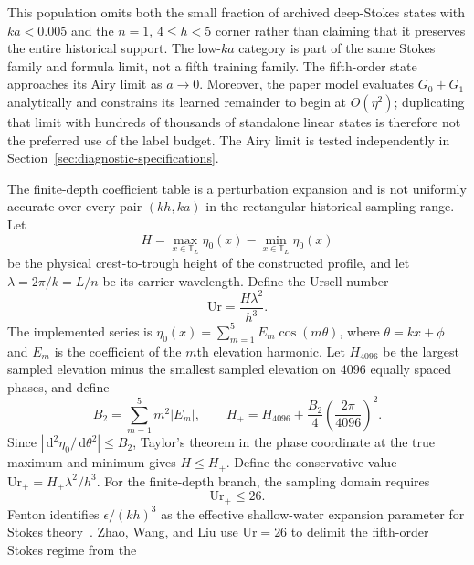 \documentclass[11pt]{article}
\newcommand{\T}{\mathbb T}
\newcommand{\dd}{\,\mathrm d}
\begin{document}
This population omits both the small fraction of archived deep-Stokes states
with $ka<0.005$ and the $n=1$, $4\leq h<5$ corner rather than claiming that
it preserves the entire historical support.  The low-$ka$ category is part of the
same Stokes family and formula limit, not a fifth training family.  The
fifth-order state
approaches its Airy limit as $a\to0$.  Moreover, the paper model evaluates
$G_0+G_1$ analytically and constrains its learned remainder to begin at
$O(\eta^2)$; duplicating that limit with hundreds of thousands of standalone
linear states is therefore not the preferred use of the label budget.  The
Airy limit is tested independently in
Section~\ref{sec:diagnostic-specifications}.

The finite-depth coefficient table is a perturbation expansion and is not
uniformly accurate over every pair $(kh,ka)$ in the rectangular historical
sampling range.  Let
\begin{equation}
  H=\max_{x\in\T_L}\eta_0(x)-\min_{x\in\T_L}\eta_0(x)
\end{equation}
be the physical crest-to-trough height of the constructed profile, and let
$\lambda=2\pi/k=L/n$ be its carrier wavelength.  Define the Ursell number
\begin{equation}
  \mathrm{Ur}=\frac{H\lambda^2}{h^3}.
  \label{eq:stokes-ursell-number}
\end{equation}
The implemented series is
$\eta_0(x)=\sum_{m=1}^{5}E_m\cos(m\theta)$, where
$\theta=kx+\phi$ and $E_m$ is the coefficient of the $m$th elevation
harmonic.  Let $H_{4096}$ be the
largest sampled elevation minus the smallest sampled elevation on 4096
equally spaced phases, and define
\begin{equation}
  B_2=\sum_{m=1}^{5}m^2|E_m|,
  \qquad
  H_+=H_{4096}
      +\frac{B_2}{4}\left(\frac{2\pi}{4096}\right)^2.
  \label{eq:stokes-height-upper-bound}
\end{equation}
Since $|\dd^2\eta_0/\dd\theta^2|\leq B_2$, Taylor's theorem in the phase
coordinate at the true maximum and minimum gives $H\leq H_+$.  Define the
conservative value
$\mathrm{Ur}_+=H_+\lambda^2/h^3$.  For the finite-depth branch, the sampling
domain requires
\begin{equation}
  \boxed{\mathrm{Ur}_+\leq26.}
  \label{eq:stokes-ursell-support}
\end{equation}
Fenton identifies $\epsilon/(kh)^3$ as the effective shallow-water
expansion parameter for Stokes theory~\cite{fenton1985}.  Zhao, Wang, and
Liu use $\mathrm{Ur}=26$ to delimit the fifth-order Stokes regime from the
\end{document}
